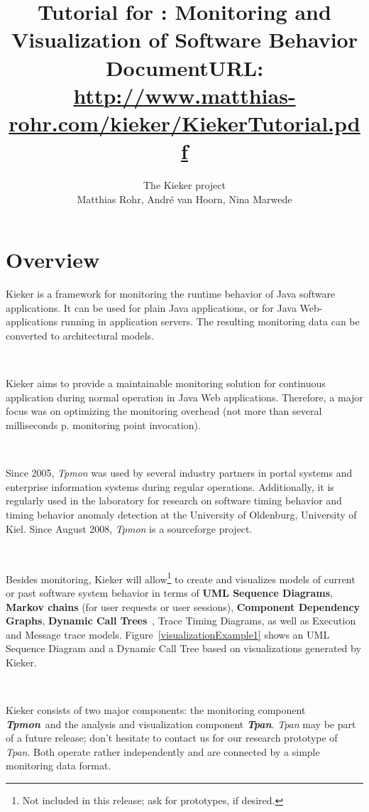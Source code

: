 \documentclass[a4paper,12pt]{scrartcl}
\title{Tutorial for \kieker : Monitoring and Visualization of Software Behavior \\ \small \vspace{3mm} DocumentURL: \href{http://www.matthias-rohr.com/kieker/KiekerTutorial.pdf}{http://www.matthias-rohr.com/kieker/KiekerTutorial.pdf}}
\author{The Kieker project \\ Matthias Rohr, Andr\'{e} van Hoorn, Nina Marwede}
\newcommand{\tpmon}{\textit{Tpmon}}
\newcommand{\tpan}{\textit{Tpan}}
\begin{document}
\maketitle
\tableofcontents
\section{Overview}

Kieker is a framework for monitoring the runtime behavior of Java software applications. It can be used for plain Java applications, or for Java Web-applications running in application servers. The resulting monitoring data can be converted to architectural models. 

\

Kieker aims to provide a maintainable monitoring solution for continuous application during normal operation in Java Web applications. Therefore, a major focus was on optimizing the monitoring overhead (not more than several milliseconds p. monitoring point invocation).

\

Since 2005, \tpmon{} was used by several industry partners in portal systems and enterprise information systems during regular operations. Additionally, it is regularly used in the laboratory for research on software timing behavior and timing behavior anomaly detection at the University of Oldenburg, University of Kiel. Since August 2008, \tpmon{} is a sourceforge project.

\

Besides monitoring, Kieker will allow\footnote{Not included in this release; ask for prototypes, if desired.} to create and visualizes models of current or past software system behavior in terms of \textbf{UML Sequence Diagrams}, \textbf{Markov chains} (for user requests or user sessions), \textbf{Component Dependency Graphs}, \textbf{Dynamic Call Trees}~\citep{AmmonsBallLarus97ExploitingHardwarePerformanceCountersWithFlowAndContextSensitiveProfiling}, Trace Timing Diagrams, as well as Execution and Message trace models. Figure~\ref{visualizationExample1} shows an UML Sequence Diagram and a Dynamic Call Tree based on visualizations generated by Kieker.

\

Kieker consists of two major components: the monitoring component \textbf{\tpmon}\ and the analysis and visualization component \textbf{\tpan}. \tpan{} may be part of a future release; don't hesitate to contact us for our research prototype of \tpan{}. Both operate rather independently and are connected by a simple monitoring data format. %
\end{document}
